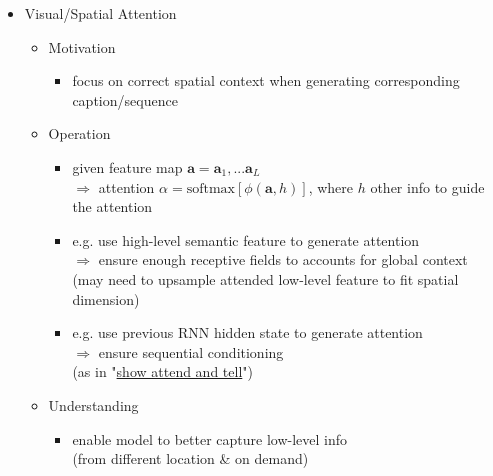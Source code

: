 \begin{itemize}
\item Visual/Spatial Attention
	\begin{itemize}
	\item Motivation
		\begin{itemize}
		\item focus on correct spatial context when generating corresponding caption/sequence
		\end{itemize}
	\item Operation
		\begin{itemize}
		\item given feature map $\mathbf a = {\mathbf a_1,...\mathbf a_L}$ \\
		$\Rightarrow$ attention $\alpha = \text{softmax} [\phi(\mathbf a, h)]$, where $h$ other info to guide the attention \\
		\item e.g. use high-level semantic feature to generate attention \\
		$\Rightarrow$ ensure enough receptive fields to accounts for global context \\
		(may need to upsample attended low-level feature to fit spatial dimension)
		\item e.g. use previous RNN hidden state to generate attention \\
		$\Rightarrow$ ensure sequential conditioning \\
		(as in "\hyperref[DL_CVNLP_Imgcap_show_attend_tell]{show attend and tell}")
		\end{itemize}
	\item Understanding
		\begin{itemize}
		\item enable model to better capture low-level info \\
		(from different location \& on demand)
		\end{itemize}
	\end{itemize}


\end{itemize}
